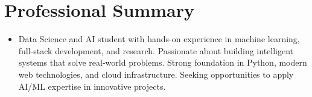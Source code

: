 \section{Professional Summary}
\vspace{2pt}
\begin{itemize}[leftmargin=0.0in, label={}]
    \item{
        \normalsize{
            Data Science and AI student with hands-on experience in machine learning, full-stack development, and research. Passionate about building intelligent systems that solve real-world problems. Strong foundation in Python, modern web technologies, and cloud infrastructure. Seeking opportunities to apply AI/ML expertise in innovative projects.
        }
    }
\end{itemize}